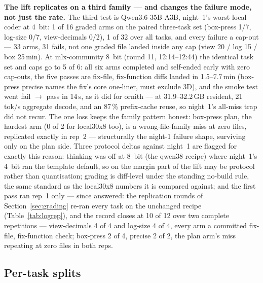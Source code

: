 \textbf{The lift replicates on a third family --- and changes the failure mode, not just the rate.} The third
test is Qwen3.6-35B-A3B, night~1's worst local coder at 4~bit: 1 of 16 graded arms on the paired three-task set
(box-press 1/7, log-size 0/7, view-decimals 0/2), 1 of 32 over all tasks, and every failure a cap-out --- 33
arms, 31 fails, not one graded file landed inside any cap (view 20 / log 15 / box 25\,min). At mlx-community
8~bit (round 11, 12:14--12:44) the identical task set and caps go to 5 of 6: all six arms completed and
self-ended early with zero cap-outs, the five passes are fix-file, fix-function diffs landed in 1.5--7.7\,min
(box-press precise names the fix's core one-liner,  must exclude 3D), and the smoke test went
fail $\rightarrow$ pass in 14\,s, as it did for ornith --- at 31.9--32.2\,GB resident, 21\,tok/s aggregate
decode, and an 87\,\% prefix-cache reuse, so night~1's all-miss trap did not recur. The one loss keeps the
family pattern honest: box-press plan, the hardest arm (0 of 2 for local30x8 too), is a wrong-file-family miss
at zero files, replicated exactly in rep~2 --- structurally the night-1 failure shape, surviving only on the
plan side. Three protocol deltas against night~1 are flagged for exactly this reason: thinking was off at
8~bit (the qwen38 recipe) where night~1's 4~bit ran the template default, so on the margin part of the lift
may be protocol rather than quantisation; grading is diff-level under the standing no-build rule, the same
standard as the local30x8 numbers it is compared against; and the first pass ran rep~1 only --- since answered:
the replication rounds of Section~\ref{sec:grading} re-ran every task on the unchanged recipe
(Table~\ref{tab:logrep}), and the record closes at 10 of 12 over two complete repetitions --- view-decimals
4 of 4 and log-size 4 of 4, every arm a committed fix-file, fix-function check; box-press 2 of 4, precise
2 of 2, the plan arm's miss repeating at zero files in both reps.

\subsection{Per-task splits}\label{sec:splits}

